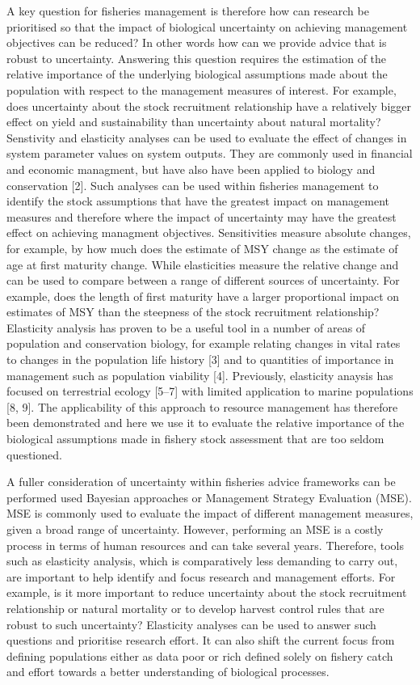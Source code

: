 \documentclass{pnastwo}
\begin{document}
\begin{article}
A key question for fisheries management is therefore how can research be prioritised so that the impact of biological uncertainty on achieving management objectives can be reduced? In other words how can we provide advice that is robust to uncertainty. Answering this question requires the estimation of the relative importance of the underlying biological assumptions made about the population with respect to the management measures of interest. For example, does uncertainty about the stock recruitment relationship have a relatively bigger eﬀect on yield and sustainability than uncertainty about natural mortality? 
Senstivity and elasticity analyses can be used to evaluate the eﬀect of changes in system parameter values on system outputs. They are commonly used in financial and economic managment, but have also have been applied to biology and conservation [2]. Such analyses can be used within fisheries management to identify the stock assumptions that have the greatest impact on management measures and therefore where the impact of uncertainty may have the greatest eﬀect on achieving managment objectives. Sensitivities measure absolute changes, for example, by how much does the estimate of MSY change as the estimate of age at first maturity change. While elasticities measure the relative change and can be used to compare between a range of diﬀerent sources of uncertainty. For example, does the length of first maturity have a larger proportional impact on estimates of MSY than the steepness of the stock recruitment relationship? Elasticity analysis has proven to be a useful tool in a number of areas of population and conservation biology, for example relating changes in vital rates to changes in the population life history [3] and to quantities of importance in management such as population viability [4]. Previously, elasticity anaysis has focused on terrestrial ecology [5–7] with limited application to marine populations [8, 9]. The applicability of this approach to resource management has therefore been demonstrated and here we use it to evaluate the relative importance of the biological assumptions made in fishery stock assessment that are too seldom questioned. 

A fuller consideration of uncertainty within fisheries advice frameworks can be performed used Bayesian approaches or Management Strategy Evaluation (MSE). MSE is commonly used to evaluate the impact of diﬀerent management measures, given a broad range of uncertainty. However, performing an MSE is a costly process in terms of human resources and can take several years. Therefore, tools such as elasticity analysis, which is comparatively less demanding to carry out, are important to help identify and focus research and management eﬀorts. For example, is it more important to reduce uncertainty about the stock recruitment relationship or natural mortality or to develop harvest control rules that are robust to such uncertainty? Elasticity analyses can be used to answer such questions and prioritise research eﬀort. It can also shift the current focus from defining populations either as data poor or rich defined solely on fishery catch and eﬀort towards a better understanding of biological processes. 


\end{article}
\end{document}
